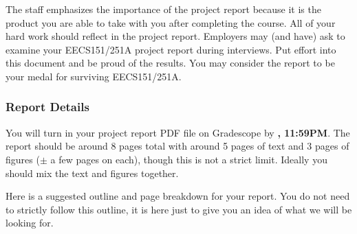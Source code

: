 \documentclass[11pt]{article}
\begin{document}
The staff emphasizes the importance of the project report because it is the product you are able to take with you after completing the course.
All of your hard work should reflect in the project report.
Employers may (and have) ask to examine your EECS151/251A project report during interviews.
Put effort into this document and be proud of the results.
You may consider the report to be your medal for surviving EECS151/251A.

\subsubsection{Report Details}
You will turn in your project report PDF file on Gradescope by \textbf{\finalReportDueDate, 11:59PM}.
The report should be around 8 pages total with around 5 pages of text and 3 pages of figures ($\pm$ a few pages on each), though this is not a strict limit.
Ideally you should mix the text and figures together.

Here is a suggested outline and page breakdown for your report.
You do not need to strictly follow this outline, it is here just to give you an idea of what we will be looking for.
\end{document}
